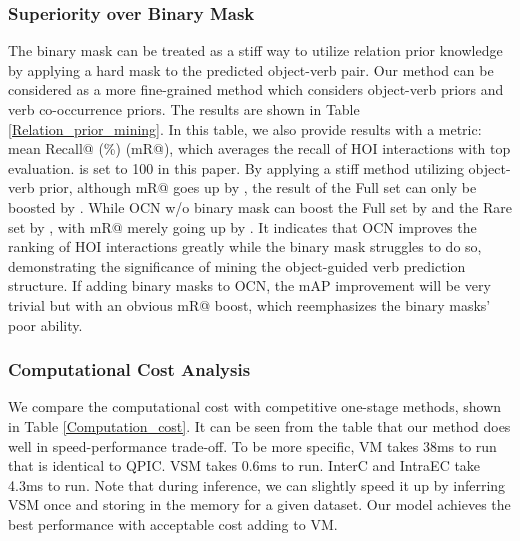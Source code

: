\documentclass[letterpaper]{article} \usepackage{aaai22}  \usepackage{times}  \usepackage{helvet}  \usepackage{courier}  \usepackage[hyphens]{url}  \usepackage{graphicx} \urlstyle{rm} \def\UrlFont{\rm}  \usepackage{natbib}  \usepackage{caption} \DeclareCaptionStyle{ruled}{labelfont=normalfont,labelsep=colon,strut=off} \frenchspacing  \setlength{\pdfpagewidth}{8.5in}  \setlength{\pdfpageheight}{11in}  \usepackage{algorithm}
\begin{document}
\subsubsection{Superiority over Binary Mask} The binary mask can be treated as a stiff way to utilize relation prior knowledge by applying a hard mask to the predicted object-verb pair. Our method can be considered as a more fine-grained method which considers object-verb priors and verb co-occurrence priors. The results are shown in Table \ref{Relation_prior_mining}. In this table, we also provide results with a metric: mean Recall@ (\%) \cite{tang2020unbiasedSG} (mR@), which averages the recall of HOI interactions with top  evaluation.  is set to 100 in this paper. By applying a stiff method utilizing object-verb prior, although mR@ goes up by , the result of the Full set can only be boosted by . While OCN w/o binary mask can boost the Full set by  and the Rare set by , with mR@ merely going up by . It indicates that OCN improves the ranking of HOI interactions greatly while the binary mask struggles to do so, demonstrating the significance of mining the object-guided verb prediction structure. If adding binary masks to OCN, the mAP improvement will be very trivial but with an obvious mR@ boost, which reemphasizes the binary masks' poor ability.




\subsubsection{Computational Cost Analysis} We compare the computational cost with competitive one-stage methods, shown in Table \ref{Computation_cost}. It can be seen from the table that our method does well in speed-performance trade-off. To be more specific, VM takes 38ms to run that is identical to QPIC. VSM takes 0.6ms to run. InterC and IntraEC take 4.3ms to run. Note that during inference, we can slightly speed it up by inferring VSM once and storing  in the memory for a given dataset. Our model achieves the best performance with acceptable cost adding to VM. 
\end{document}
